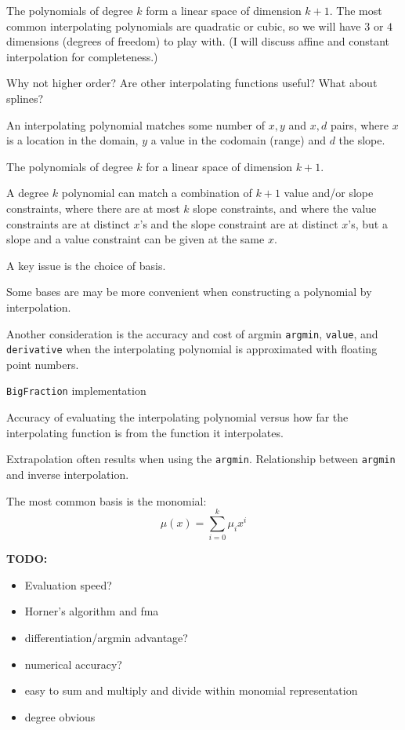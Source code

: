 The polynomials of degree $k$ form a linear space of dimension
$k+1$\cite{wiki:Polynomial}.
The most common interpolating polynomials are quadratic or cubic,
so we will have $3$ or $4$ dimensions (degrees of freedom) to play
with. 
(I will discuss affine and constant interpolation for 
completeness.)

Why not higher order? Are other interpolating functions useful?
What about splines?

An interpolating polynomial matches some number of $x,y$
and $x,d$ pairs, where $x$ is a location in the domain,
$y$ a value in the codomain (range) and $d$ the slope.

The polynomials of degree $k$ for a linear space of dimension
$k+1$. 

A degree $k$ polynomial can match a combination of $k+1$ value 
and/or 
slope constraints, where there are at most $k$ slope constraints,
and where the value constraints are at distinct $x$'s and the
slope constraint are at distinct $x$'s, but a slope and a value 
constraint can be given at the same $x$.

A key issue is the choice of basis.

Some bases are may be more convenient when constructing a 
polynomial by interpolation.

Another consideration is the accuracy and cost of 
argmin \texttt{argmin}, \texttt{value}, and \texttt{derivative} 
when the interpolating polynomial is approximated with 
floating point numbers.

\texttt{BigFraction} implementation

Accuracy of evaluating the interpolating polynomial
versus how far the interpolating function is from the function it
interpolates.

Extrapolation often results when using the \texttt{argmin}.
Relationship between \texttt{argmin} and inverse interpolation.

\setcounter{currentlevel}{\value{baseSectionLevel}}
\label{sec:Monomial-basis}

The most common basis is the monomial:
\begin{equation}
\mu(x) = \sum_{i=0}^{k} \mu_i x^i
\end{equation}

\textbf{TODO:} 
\begin{itemize}
  \item Evaluation speed?
  \item Horner's algorithm and fma
  \item differentiation/argmin advantage?
  \item numerical accuracy?
  \item easy to sum and multiply and divide within monomial
  representation
  \item degree obvious
\end{itemize}

